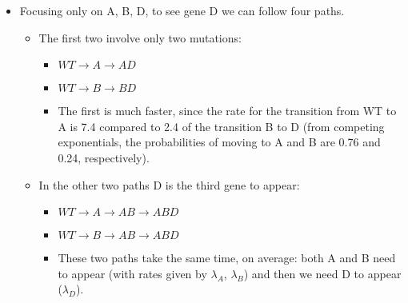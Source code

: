 \documentclass[11pt]{article}
\begin{document}
\begin{enumerate}
\begin{itemize}
\item Focusing only on A, B, D, to see gene D we can follow four paths.
\begin{itemize}
\item The first two involve only two mutations:
\begin{itemize}
\item \(WT \rightarrow A \rightarrow AD\)
\item \(WT \rightarrow B \rightarrow BD\)
\item The first is much faster, since the rate for the transition from WT to A is 7.4 compared to 2.4 of the transition B to D (from competing exponentials, the probabilities of moving to A and B are 0.76 and 0.24, respectively).
\end{itemize}
\item In the other two paths D is the third gene to appear:
\begin{itemize}
\item \(WT \rightarrow A \rightarrow AB \rightarrow ABD\)
\item \(WT \rightarrow B \rightarrow AB \rightarrow ABD\)
\item These two paths take the same time, on average: both A and B need to appear (with rates given by \(\lambda_A\), \(\lambda_B\)) and then we need D to appear (\(\lambda_D\)).
\end{itemize}


\end{itemize}
\end{itemize}
\end{enumerate}
\end{document}
